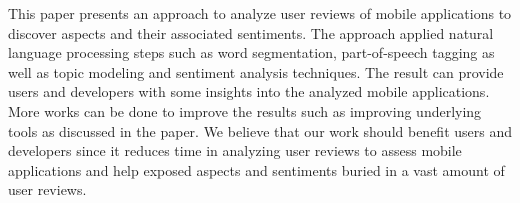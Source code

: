 This paper presents an approach to analyze user reviews of mobile applications to discover aspects and their associated sentiments. The approach applied natural language processing steps such as word segmentation, part-of-speech tagging as well as topic modeling and sentiment analysis techniques. The result can provide users and developers with some insights into the analyzed mobile applications. More works can be done to improve the results such as improving underlying tools as discussed in the paper. We believe that our work should benefit users and developers since it reduces time in analyzing user reviews to assess mobile applications and help exposed aspects and sentiments buried in a vast amount of user reviews. 

